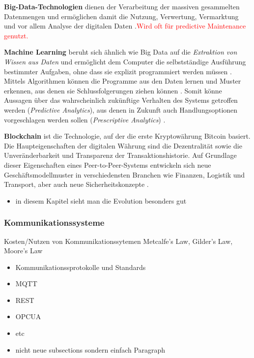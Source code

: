 \noindent\hspace*{10mm}
 \textbf{Big-Data-Technologien} dienen der Verarbeitung der massiven gesammelten Datenmengen und ermöglichen damit die Nutzung, Verwertung, Vermarktung und vor allem Analyse der digitalen Daten \citep{Radtke2019}.\textcolor{red}{{Wird oft für predictive Maintenance genutzt.}}

 \noindent\hspace*{10mm}
 \textbf{Machine Learning} beruht sich ähnlich wie Big Data auf die \textit{Extraktion von Wissen aus Daten} und ermöglicht dem Computer die selbstständige Ausführung bestimmter Aufgaben, ohne dass sie explizit programmiert werden müssen \citep{Hnisch2017}. Mittels Algorithmen können die Programme aus den Daten lernen und Muster erkennen, aus denen sie Schlussfolgerungen ziehen können \citep{Elsner2018}. Somit könne Aussagen über das wahrscheinlich zukünftige Verhalten des Systems getroffen werden (\textit{Predictive Analytics}), aus denen in Zukunft auch Handlungsoptionen vorgeschlagen werden sollen (\textit{Prescriptive Analytics}) \citep{Huebschle2017}.

 \noindent\hspace*{10mm}
 \textbf{Blockchain} ist die Technologie, auf der die erste Kryptowährung Bitcoin basiert. Die Haupteigenschaften der digitalen Währung sind die Dezentralität sowie  die Unveränderbarkeit und Transparenz der Transaktionshistorie. Auf Grundlage dieser Eigenschaften eines Peer-to-Peer-Systems entwickeln sich neue Geschäftsmodellmuster in verschiedensten Branchen wie Finanzen,  Logistik und Transport, aber auch neue Sicherheitskonzepte \citep{Elsner2018}.

\begin{itemize}
  \item in diesem Kapitel sieht man die Evolution besonders gut
\end{itemize}

\subsubsection{Kommunikationssysteme}
Kosten/Nutzen von Kommunikationssytemen
Metcalfe’s Law, Gilder’s Law, Moore’s Law
\begin{itemize}
  \item Kommunikationssprotokolle und Standards
  \item MQTT
  \item REST
  \item OPCUA
  \item etc
  \item nicht neue subsections sondern einfach Paragraph
\end{itemize}
